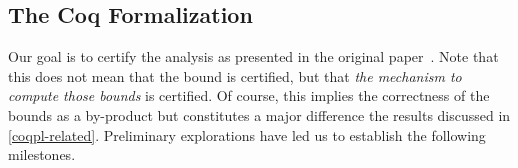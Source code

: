 

\tocless\subsection{The Coq Formalization}

Our goal is to certify the analysis as presented in the original paper~\cite{jones2009}.
Note that this does not mean that the bound is certified, but that \emph{the mechanism to compute those bounds} is certified.
Of course, this implies the correctness of the bounds as a by-product but constitutes a major difference \wrt the results discussed in \autoref{coqpl-related}.
%
Preliminary explorations have led us to establish the following milestones.

